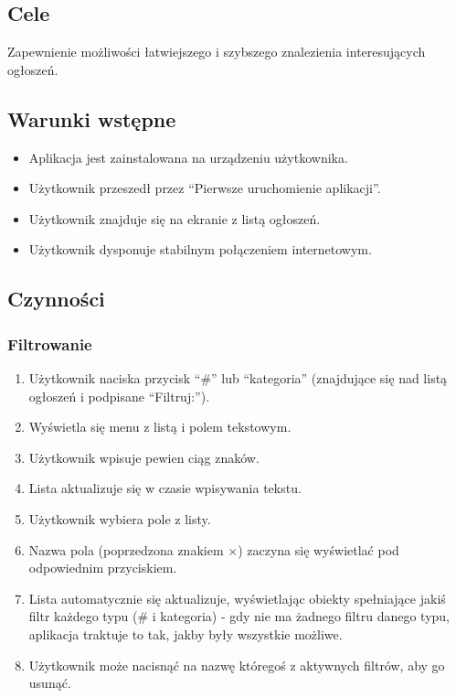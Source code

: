 \documentclass[12pt,a4paper,twoside]{article}
\begin{document}
    \subsection{Cele}
    Zapewnienie możliwości łatwiejszego i szybszego znalezienia interesujących ogłoszeń.


    \subsection{Warunki wstępne}
    \begin{itemize}
        \item Aplikacja jest zainstalowana na urządzeniu użytkownika.
        \item Użytkownik przeszedł przez ``Pierwsze uruchomienie aplikacji''.
        \item Użytkownik znajduje się na ekranie z listą ogłoszeń.
        \item Użytkownik dysponuje stabilnym połączeniem internetowym.
    \end{itemize}


    \subsection{Czynności}


    \subsubsection{Filtrowanie}


    \begin{enumerate}
        \item Użytkownik naciska przycisk ``\#'' lub ``kategoria'' (znajdujące się nad listą ogłoszeń i podpisane ``Filtruj:'').
        \item Wyświetla się menu z listą i polem tekstowym.
        \item Użytkownik wpisuje pewien ciąg znaków.
        \item Lista aktualizuje się w czasie wpisywania tekstu.
        \item Użytkownik wybiera pole z listy.
        \item Nazwa pola (poprzedzona znakiem $\times$) zaczyna się wyświetlać pod odpowiednim przyciskiem.
        \item Lista automatycznie się aktualizuje, wyświetlając obiekty spełniające jakiś filtr każdego typu (\# i kategoria) - gdy nie ma żadnego filtru danego typu, aplikacja traktuje to tak, jakby były wszystkie możliwe.
        \item Użytkownik może nacisnąć na nazwę któregoś z aktywnych filtrów, aby go usunąć.
    \end{enumerate}
\end{document}

